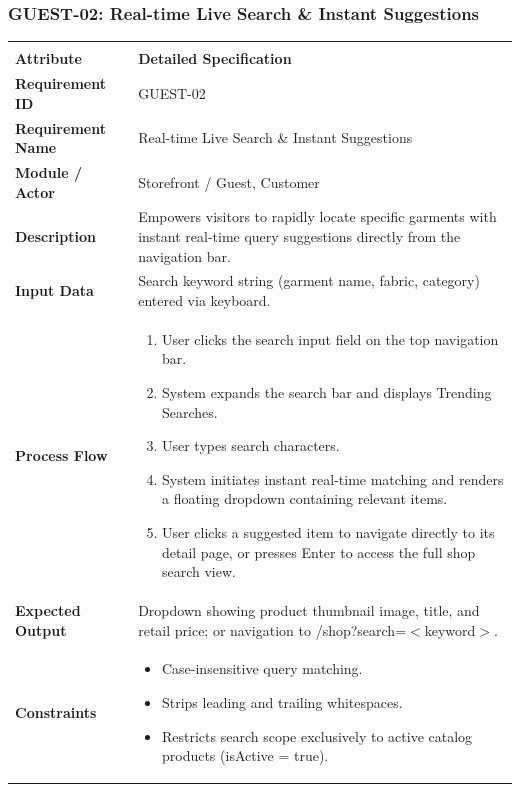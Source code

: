 \documentclass[12pt,a4paper,oneside]{report}
\begin{document}
\subsubsection{GUEST-02: Real-time Live Search \& Instant Suggestions}
\begin{longtable}{|p{3.6cm}|p{11.9cm}|}
\hline
\rowcolor{PrimaryBrown}
\multicolumn{2}{|p{15.5cm}|}{\textbf{\textcolor{white}{Functional Specification: GUEST-02 -- Real-time Live Search \& Instant Suggestions}}} \\
\hline
\endfirsthead
\hline
\rowcolor{PrimaryBrown}
\multicolumn{2}{|p{15.5cm}|}{\textbf{\textcolor{white}{Functional Specification: GUEST-02 (Continued)}}} \\
\hline
\textbf{Attribute} & \textbf{Detailed Specification} \\
\hline
\endhead
\hline
\endfoot
\textbf{Requirement ID} & GUEST-02 \\
\hline
\textbf{Requirement Name} & Real-time Live Search \& Instant Suggestions \\
\hline
\textbf{Module / Actor} & Storefront / Guest, Customer \\
\hline
\textbf{Description} & Empowers visitors to rapidly locate specific garments with instant real-time query suggestions directly from the navigation bar. \\
\hline
\textbf{Input Data} & Search keyword string (garment name, fabric, category) entered via keyboard. \\
\hline
\textbf{Process Flow} & \begin{enumerate}[leftmargin=*,nosep,topsep=2pt]
  \item User clicks the search input field on the top navigation bar.
  \item System expands the search bar and displays Trending Searches.
  \item User types search characters.
  \item System initiates instant real-time matching and renders a floating dropdown containing relevant items.
  \item User clicks a suggested item to navigate directly to its detail page, or presses Enter to access the full shop search view.
\end{enumerate} \\
\hline
\textbf{Expected Output} & Dropdown showing product thumbnail image, title, and retail price; or navigation to /shop?search=$<$keyword$>$. \\
\hline
\textbf{Constraints} & \begin{itemize}[leftmargin=*,nosep,topsep=2pt]
  \item Case-insensitive query matching.
  \item Strips leading and trailing whitespaces.
  \item Restricts search scope exclusively to active catalog products (isActive = true).
\end{itemize} \\
\hline
\end{longtable}
\end{document}
